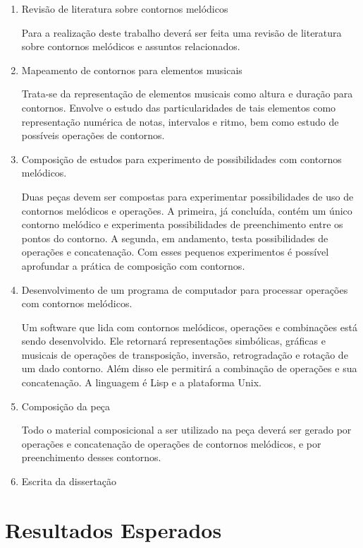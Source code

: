 \documentclass{article}
\begin{document}
\begin{enumerate}
\item Revisão de literatura sobre contornos melódicos

  Para a realização deste trabalho deverá ser feita uma revisão de
  literatura sobre contornos melódicos e assuntos relacionados.

\item Mapeamento de contornos para elementos musicais

  Trata-se da representação de elementos musicais como altura e
  duração para contornos. Envolve o estudo das particularidades de
  tais elementos como representação numérica de notas, intervalos e
  ritmo, bem como estudo de possíveis operações de contornos.

\item Composição de estudos para experimento de possibilidades com
  contornos melódicos.

  Duas peças devem ser compostas para experimentar possibilidades de
  uso de contornos melódicos e operações. A primeira, já concluída,
  contém um único contorno melódico e experimenta possibilidades de
  preenchimento entre os pontos do contorno. A segunda, em andamento,
  testa possibilidades de operações e concatenação. Com esses pequenos
  experimentos é possível aprofundar a prática de composição com
  contornos.

\item Desenvolvimento de um programa de computador para processar
  operações com contornos melódicos.

  Um software que lida com contornos melódicos, operações e
  combinações está sendo desenvolvido. Ele retornará representações
  simbólicas, gráficas e musicais de operações de transposição,
  inversão, retrogradação e rotação de um dado contorno. Além disso
  ele permitirá a combinação de operações e sua concatenação. A
  linguagem é Lisp e a plataforma Unix.

  
\item Composição da peça

  Todo o material composicional a ser utilizado na peça deverá ser
  gerado por operações e concatenação de operações de contornos
  melódicos, e por preenchimento desses contornos.

\item Escrita da dissertação
\end{enumerate}

\section{Resultados Esperados}
\label{sec:resultados-esperados}
\end{document}
